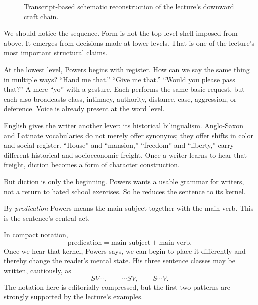 \begin{figure}[h]
\centering
{}
\caption{Transcript-based schematic reconstruction of the lecture's downward craft chain.}
\end{figure}

We should notice the sequence. Form is not the top-level shell imposed from above. It emerges from decisions made at lower levels. That is one of the lecture's most important structural claims.

At the lowest level, Powers begins with register. How can we say the same thing in multiple ways? ``Hand me that.'' ``Give me that.'' ``Would you please pass that?'' A mere ``yo'' with a gesture. Each performs the same basic request, but each also broadcasts class, intimacy, authority, distance, ease, aggression, or deference. Voice is already present at the word level.

English gives the writer another lever: its historical bilingualism. Anglo-Saxon and Latinate vocabularies do not merely offer synonyms; they offer shifts in color and social register. ``House'' and ``mansion,'' ``freedom'' and ``liberty,'' carry different historical and socioeconomic freight. Once a writer learns to hear that freight, diction becomes a form of character construction.

But diction is only the beginning. Powers wants a usable grammar for writers, not a return to hated school exercises. So he reduces the sentence to its kernel.

\begin{definition}
By \emph{predication} Powers means the main subject together with the main verb. This is the sentence's central act.
\end{definition}

In compact notation,
\begin{equation}
\text{predication} = \text{main subject} + \text{main verb}.
\end{equation}
Once we hear that kernel, Powers says, we can begin to place it differently and thereby change the reader's mental state. His three sentence classes may be written, cautiously, as
\begin{equation}
SV\cdots,\qquad \cdots SV,\qquad S\cdots V.
\end{equation}
The notation here is editorially compressed, but the first two patterns are strongly supported by the lecture's examples.


